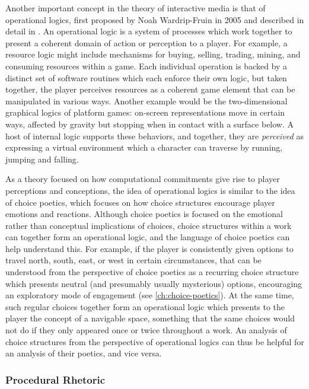 Another important concept in the theory of interactive media is that of operational logics, first proposed by Noah Wardrip-Fruin in 2005 \citep{WardripFruin2005} and described in detail in \citep{Mateas2009}.
%
An operational logic is a system of processes which work together to present a coherent domain of action or perception to a player.
%
For example, a resource logic might include mechanisms for buying, selling, trading, mining, and consuming resources within a game.
%
Each individual operation is backed by a distinct set of software routines which each enforce their own logic, but taken together, the player perceives resources as a coherent game element that can be manipulated in various ways.
%
Another example would be the two-dimensional graphical logics of platform games: on-screen representations move in certain ways, affected by gravity but stopping when in contact with a surface below.
%
A host of internal logic supports these behaviors, and together, they are \emph{perceived} as expressing a virtual environment which a character can traverse by running, jumping and falling.


As a theory focused on how computational commitments give rise to player perceptions and conceptions, the idea of operational logics is similar to the idea of choice poetics, which focuses on how choice structures encourage player emotions and reactions.
%
Although choice poetics is focused on the emotional rather than conceptual implications of choices, choice structures within a work can together form an operational logic, and the language of choice poetics can help understand this.
%
For example, if the player is consistently given options to travel north, south, east, or west in certain circumstances, that can be understood from the perspective of choice poetics as a recurring choice structure which presents neutral (and presumably usually mysterious) options, encouraging an exploratory mode of engagement (see \cref{ch:choice-poetics}).
%
At the same time, such regular choices together form an operational logic which presents to the player the concept of a navigable space, something that the same choices would not do if they only appeared once or twice throughout a work.
%
An analysis of choice structures from the perspective of operational logics can thus be helpful for an analysis of their poetics, and vice versa.


\subsubsection{Procedural Rhetoric}

